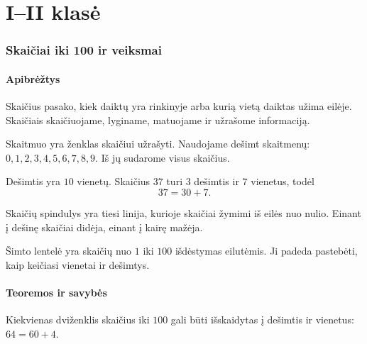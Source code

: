 \part{I--II klasė}

\section{Skaičiai iki 100 ir veiksmai}\label{sec:skaiciai-iki-100-ir-veiksmai}

\subsection{Apibrėžtys}

\begin{apibreztis}
Skaičius pasako, kiek daiktų yra rinkinyje arba kurią vietą daiktas užima eilėje. Skaičiais skaičiuojame, lyginame, matuojame ir užrašome informaciją.
\end{apibreztis}

\begin{apibreztis}
Skaitmuo yra ženklas skaičiui užrašyti. Naudojame dešimt skaitmenų: \(0,1,2,3,4,5,6,7,8,9\). Iš jų sudarome visus skaičius.
\end{apibreztis}

\begin{apibreztis}
Dešimtis yra \(10\) vienetų. Skaičius \(37\) turi \(3\) dešimtis ir \(7\) vienetus, todėl
\[
37=30+7.
\]
\end{apibreztis}

\begin{apibreztis}
Skaičių spindulys yra tiesi linija, kurioje skaičiai žymimi iš eilės nuo nulio. Einant į dešinę skaičiai didėja, einant į kairę mažėja.
\end{apibreztis}

\begin{apibreztis}
Šimto lentelė yra skaičių nuo \(1\) iki \(100\) išdėstymas eilutėmis. Ji padeda pastebėti, kaip keičiasi vienetai ir dešimtys.
\end{apibreztis}

\subsection{Teoremos ir savybės}

\begin{savybe}
Kiekvienas dviženklis skaičius iki \(100\) gali būti išskaidytas į dešimtis ir vienetus: \(64=60+4\).
\end{savybe}

